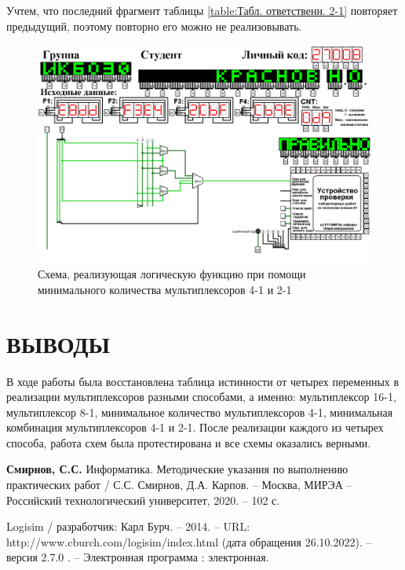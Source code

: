 \documentclass{mirea}
\begin{document}
Учтем, что последний фрагмент таблицы \ref{table:Табл. ответственн. 2-1} повторяет предыдущий, поэтому повторно его можно не реализовывать.

\begin{figure}[h!]
	\includegraphics[width=\textwidth]{Мультиплекс 2-1.png}
	\caption{Схема, реализующая логическую функцию при помощи минимального количества мультиплексоров 4-1 и 2-1}
	\label{circ:Мультиплекс 2-1}
\end{figure}

\chapter{ВЫВОДЫ}
В ходе работы была восстановлена таблица истинности от четырех переменных в реализации мультиплексоров разными способами, а именно: мультиплексор 16-1, мультиплексор 8-1, минимальное количество мультиплексоров 4-1, минимальная комбинация мультиплексоров 4-1 и 2-1. После реализации каждого из четырех способа, работа схем была протестирована и все схемы оказались верными.
	
\begin{thebibliography}{99}
	\textbf{Смирнов, С.С.} Информатика. Методические указания по выполнению практических работ / С.С. Смирнов, Д.А. Карпов. – Москва, МИРЭА – Российский технологический университет, 2020. – 102 с.
	
	Logisim / разработчик: Карл Бурч. – 2014. – URL: http://www.cburch.com/logisim/index.html (дата обращения 26.10.2022). – версия 2.7.0 . – Электронная программа : электронная.
\end{thebibliography}
	
	
\end{document}
